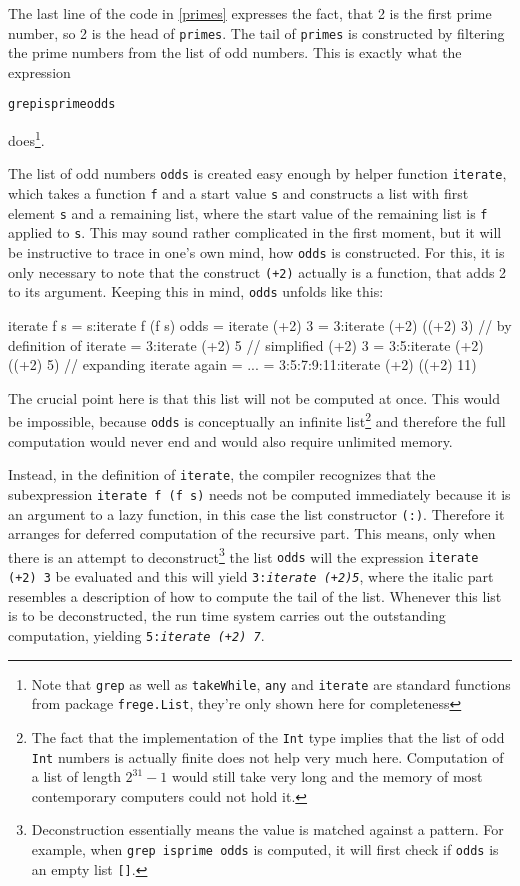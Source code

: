 \documentclass[a4paper,twocolumn,landscape]{report}
\newenvironment{code}[0]{\verbatim}{\endverbatim}
\newcommand{\ex}[1]{\begin{alltt}#1\end{alltt}}
\begin{document}
The last line of the code in \ref{primes} expresses the fact, that 2 is
the first prime number, so 2 is the head of {\tt primes}. The tail of
{\tt primes} is constructed by filtering the prime numbers from the list
of odd numbers.
This is
exactly what the expression
\ex{grep isprime odds}
does\footnote{Note that {\tt grep} as well as {\tt takeWhile},
\texttt{any}
and {\tt iterate} are
standard functions from
package {\tt frege.List}, they're only shown here for completeness}.

The list of odd numbers {\tt odds} is created easy enough by helper
function {\tt iterate}, which takes a function {\tt f} and a start value
{\tt s} and constructs a list with first element {\tt s} and a remaining
list, where the start value of the remaining list is {\tt f} applied to
{\tt s}.
This may sound rather complicated in the first moment, but it will be
instructive to trace in one's own mind, how {\tt odds} is constructed.
For this, it is only necessary to note that the construct {\tt (+2)}
actually is a function, that adds 2 to its argument. Keeping this in
mind, {\tt odds} unfolds like this:

\begin{code}
iterate f s = s:iterate f (f s)
odds = iterate (+2) 3
     = 3:iterate (+2) ((+2) 3)    // by definition of iterate
     = 3:iterate (+2) 5           // simplified (+2) 3
     = 3:5:iterate (+2) ((+2) 5)  // expanding iterate again
     = ...
     = 3:5:7:9:11:iterate (+2) ((+2) 11)
\end{code}

The crucial point here is that this list will not be computed at
once. This would be impossible, because {\tt odds} is
conceptually an infinite list\footnote{The fact that the
implementation of the {\tt Int}
type implies that the list of odd {\tt Int} numbers is actually finite
does not help very much here. Computation of a list of length $2^{31}-1$
would still
take very long and the memory of most contemporary computers could not
hold it.}
and therefore the full computation
would never end and would also require unlimited memory.

Instead, in the definition of {\tt iterate}, the compiler
recognizes that the subexpression {\tt iterate f (f s)}
needs not be computed immediately
because it is an argument to a lazy function,
in this case the list constructor {\tt (:)}.
Therefore it arranges for deferred computation of the recursive
part. This means, only when there is an attempt to
deconstruct\footnote{
Deconstruction essentially means the value
is matched against a pattern. For example, when {\tt grep
isprime odds} is computed, it will first check if {\tt odds} is
an empty list {\tt []}.}
the list {\tt odds} will the expression
{\tt iterate (+2) 3} be evaluated and this will yield
{\tt 3:{\it iterate (+2)5}}, where the italic part resembles a
description of how to
compute the tail of the list. Whenever this list is to be
deconstructed, the run time system carries out the outstanding
computation, yielding {\tt 5:{\it iterate (+2) 7}}.
\end{document}
